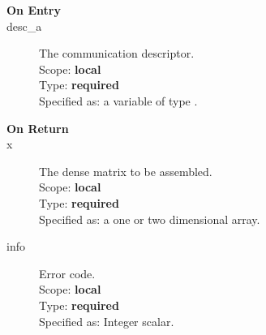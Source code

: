 %
%


\begin{description}
\item[\bf On Entry]
\item[desc\_a] The communication descriptor.\\
Scope: {\bf local} \\
Type: {\bf required}\\
Specified as: a variable of type \descdata.\\
\end{description}

\begin{description}
\item[\bf On Return]
\item[x] The dense matrix to be assembled.\\
Scope: {\bf local} \\
Type: {\bf required}\\
Specified as: a one or two dimensional array.\\
\item[info] Error code.\\
Scope: {\bf local} \\
Type: {\bf required}\\
Specified as: Integer scalar.\\
\end{description}


%
%



